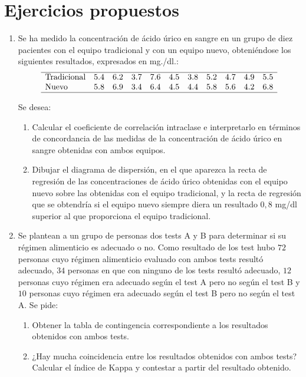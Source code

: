 \section{Ejercicios propuestos}
\begin{enumerate}
\item Se ha medido la concentración de ácido úrico en sangre en un grupo de diez pacientes con el equipo tradicional y con un  equipo nuevo,
obteniéndose los siguientes resultados, expresados en mg./dl.:
\[
\begin{array}{lcccccccccc}
\hline
\text{Tradicional} & 5.4 & 6.2 & 3.7 & 7.6 & 4.5 & 3.8 & 5.2 & 4.7 & 4.9 & 5.5\\
\text{Nuevo}       & 5.8 & 6.9 & 3.4 & 6.4 & 4.5 & 4.4 & 5.8 & 5.6 & 4.2 & 6.8\\
\hline
\end{array}
\]

Se desea:
\begin{enumerate}
\item Calcular el coeficiente de correlación intraclase e interpretarlo en términos de concordancia de las medidas de la concentración de ácido úrico en sangre obtenidas con ambos equipos.
\item Dibujar el diagrama de dispersión, en el que aparezca la recta de regresión de las concentraciones de ácido úrico obtenidas con el equipo nuevo sobre las obtenidas con el equipo tradicional, y la recta de regresión que se obtendría si el equipo nuevo siempre diera un resultado $0,8 $ mg/dl superior al que proporciona el equipo tradicional.
\end{enumerate}

\item Se plantean a un grupo de personas dos tests A y B para determinar si su régimen alimenticio es adecuado o no. Como resultado de los
test hubo $72$ personas cuyo régimen alimenticio evaluado con ambos tests resultó adecuado, $34$ personas en que con ninguno de los tests
resultó adecuado, $12$ personas cuyo régimen era adecuado según el test A pero no según el test B y $10$ personas cuyo régimen era adecuado
según el test B pero no según el test A. Se pide:
\begin{enumerate}
\item Obtener la tabla de contingencia correspondiente a los resultados obtenidos con ambos tests.
\item ¿Hay mucha coincidencia entre los resultados obtenidos con ambos tests? Calcular el índice de Kappa y contestar a partir del resultado obtenido.
\end{enumerate}
\end{enumerate}